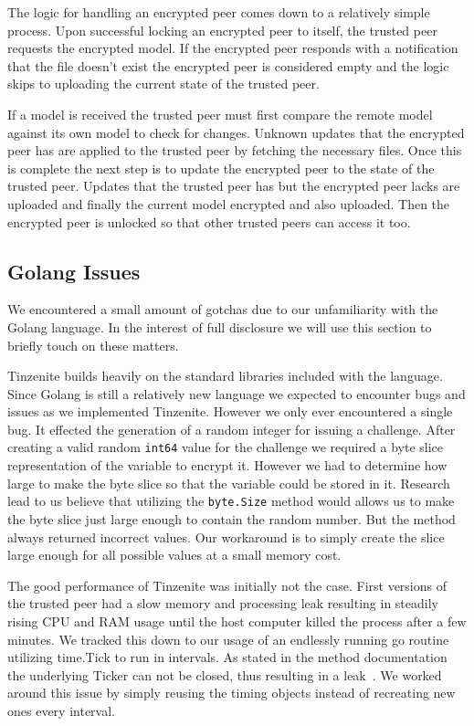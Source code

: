 The logic for handling an encrypted peer comes down to a relatively simple process.
Upon successful locking an encrypted peer to itself, the trusted peer requests the encrypted model.
If the encrypted peer responds with a notification that the file doesn't exist the encrypted peer is considered empty and the logic skips to uploading the current state of the trusted peer.

If a model is received the trusted peer must first compare the remote model against its own model to check for changes.
Unknown updates that the encrypted peer has are applied to the trusted peer by fetching the necessary files.
Once this is complete the next step is to update the encrypted peer to the state of the trusted peer.
Updates that the trusted peer has but the encrypted peer lacks are uploaded and finally the current model encrypted and also uploaded.
Then the encrypted peer is unlocked so that other trusted peers can access it too.

\subsection{Golang Issues}
\label{sub:Golang Issues}

We encountered a small amount of gotchas due to our unfamiliarity with the Golang language.
In the interest of full disclosure we will use this section to briefly touch on these matters.

Tinzenite builds heavily on the standard libraries included with the language.
Since Golang is still a relatively new language we expected to encounter bugs and issues as we implemented Tinzenite.
However we only ever encountered a single bug.
It effected the generation of a random integer for issuing a challenge.
After creating a valid random \texttt{int64} value for the challenge we required a byte slice representation of the variable to encrypt it.
However we had to determine how large to make the byte slice so that the variable could be stored in it.
Research lead to us believe that utilizing the \texttt{byte.Size} method would allows us to make the byte slice just large enough to contain the random number.
But the method always returned incorrect values.
Our workaround is to simply create the slice large enough for all possible values at a small memory cost.

The good performance of Tinzenite was initially not the case.
First versions of the trusted peer had a slow memory and processing leak resulting in steadily rising CPU and RAM usage until the host computer killed the process after a few minutes.
We tracked this down to our usage of an endlessly running go routine utilizing time.Tick to run in intervals.
As stated in the method documentation the underlying Ticker can not be closed, thus resulting in a leak~\cite{web:site:golang:time:tick}.
We worked around this issue by simply reusing the timing objects instead of recreating new ones every interval.

